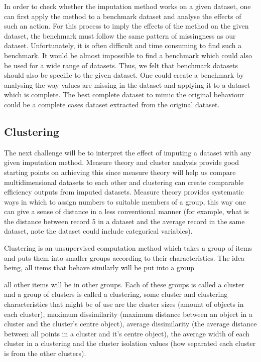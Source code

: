 \documentclass[conference,compsoc]{IEEEtran}
\begin{document}
		In order to check whether the imputation method works on a given dataset, one can first apply the method to a benchmark dataset and analyse the effects of such an action. For this process to imply the effects of the method on the given dataset, the benchmark must follow the same pattern of missingness as our dataset. Unfortunately, it is often difficult and time consuming to find such a benchmark. It would be almost impossible to find a benchmark which could also be used for a wide range of datasets. Thus, we felt that benchmark datasets should also be specific to the given dataset. One could create a benchmark by analysing the way values are missing in the dataset and applying it to a dataset which is complete. The best complete dataset to mimic the original behaviour could be a complete cases dataset extracted from the original dataset.
		

		\subsection{Clustering} %
		\label{sub:clustering}
		
		The next challenge will be to interpret the effect of imputing a dataset with any given imputation method. Measure theory \cite{measure} and cluster analysis \cite{clustering} provide good starting points on achieving this since measure theory will help us compare multidimensional datasets to each other and clustering can create comparable efficiency outputs from imputed datasets. Measure theory provides systematic ways in which to assign numbers to suitable members of a group, this way one can give a sense of distance in a less conventional manner (for example, what is the distance between record 5 in a dataset and the average record in the same dataset, note the dataset could include categorical variables). 

		Clustering is an unsupervised computation method which takes a group of items and puts them into smaller groups according to their characteristics. The idea being, all items that behave similarly will be put into a group

		all other items will be in other groups. Each of these groups is called a cluster and a group of clusters is called a clustering, some cluster and clustering characteristics that might be of use are the cluster sizes (amount of objects in each cluster), maximum dissimilarity (maximum distance between an object in a cluster and the cluster's centre object), average dissimilarity (the average distance between all points in a cluster and it's centre object), the average width of each cluster in a clustering and the cluster isolation values (how separated each cluster is from the other clusters)\cite{clust-char}.
\end{document}
